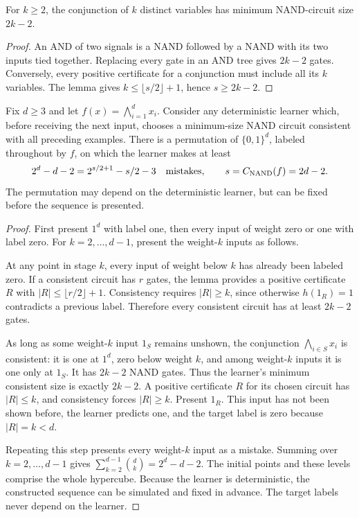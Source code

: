\begin{corollary}
\label{cor:occam:nand-and}
For $k\ge2$, the conjunction of $k$ distinct variables has minimum
NAND-circuit size $2k-2$.
\end{corollary}

\begin{proof}
An AND of two signals is a NAND followed by a NAND with its two inputs
tied together. Replacing every gate in an AND tree gives $2k-2$ gates.
Conversely, every positive certificate for a conjunction must include
all its $k$ variables. The lemma gives
$k\le\lfloor s/2\rfloor+1$, hence $s\ge2k-2$.
\end{proof}

\begin{theorem}
\label{thm:occam:nand-ladder}
Fix $d\ge3$ and let $f(x)=\bigwedge_{i=1}^d x_i$. Consider any
deterministic learner which, before receiving the next input, chooses
a minimum-size NAND circuit consistent with all preceding examples.
There is a permutation of $\{0,1\}^d$, labeled throughout by $f$,
on which the learner makes at least
\[
 2^d-d-2
   =2^{s/2+1}-s/2-3
 \quad\hbox{mistakes},\qquad s=C_{\mathrm{NAND}}(f)=2d-2.
\]
The permutation may depend on the deterministic learner, but can be
fixed before the sequence is presented.
\end{theorem}

\begin{proof}
First present $1^d$ with label one, then every input of weight zero
or one with label zero. For $k=2,\ldots,d-1$, present the weight-$k$
inputs as follows.

At any point in stage $k$, every input of weight below $k$ has already
been labeled zero. If a consistent circuit has $r$ gates, the lemma
provides a positive certificate $R$ with
$|R|\le\lfloor r/2\rfloor+1$. Consistency requires $|R|\ge k$,
since otherwise $h(1_R)=1$ contradicts a previous label. Therefore
every consistent circuit has at least $2k-2$ gates.

As long as some weight-$k$ input $1_S$ remains unshown, the conjunction
$\bigwedge_{i\in S}x_i$ is consistent: it is one at $1^d$, zero below
weight $k$, and among weight-$k$ inputs it is one only at $1_S$.
It has $2k-2$ NAND gates. Thus the learner's minimum consistent size
is exactly $2k-2$. A positive certificate $R$ for its chosen circuit
has $|R|\le k$, and consistency forces $|R|\ge k$. Present $1_R$.
This input has not been shown before, the learner predicts one, and
the target label is zero because $|R|=k<d$.

Repeating this step presents every weight-$k$ input as a mistake.
Summing over $k=2,\ldots,d-1$ gives
$\sum_{k=2}^{d-1}\binom dk=2^d-d-2$. The initial points and these
levels comprise the whole hypercube. Because the learner is
deterministic, the constructed sequence can be simulated and fixed
in advance. The target labels never depend on the learner.
\end{proof}

